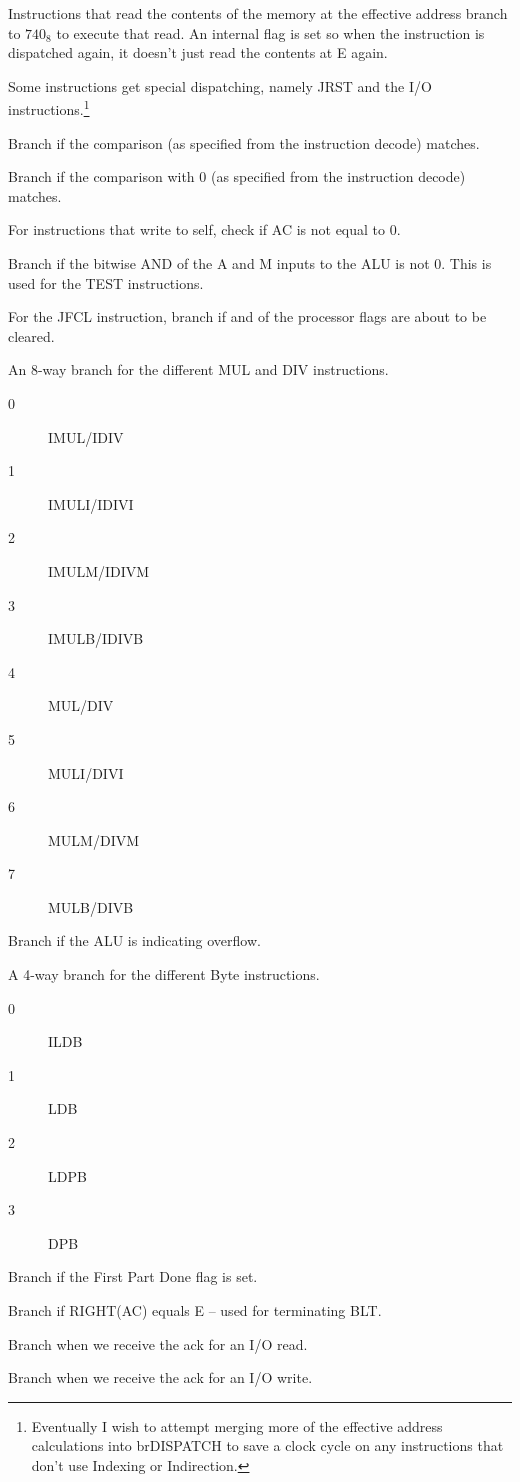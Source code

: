 \documentclass[12pt]{report}
\newcommand{\code}[1]{\textsf{#1}}
\begin{document}
\begin{description}
  Instructions that read the contents of the memory at the effective address branch to $740_8$
  to execute that read.  An internal flag is set so when the instruction is dispatched again, it
  doesn't just read the contents at E again.

  Some instructions get special dispatching, namely \code{JRST} and the I/O
  instructions.\footnote{Eventually I wish to attempt merging more of the effective address
    calculations into brDISPATCH to save a clock cycle on any instructions that don't use
    Indexing or Indirection.}
\item[brCOMP]
  Branch if the comparison (as specified from the instruction decode) matches.
\item[brCOMP0]
  Branch if the comparison with 0 (as specified from the instruction decode) matches.
\item[brSELF]
  For instructions that write to self, check if AC is not equal to 0.
\item[brTEST]
  Branch if the bitwise AND of the A and M inputs to the ALU is not 0.  This is used for the
  \code{TEST} instructions.
\item[brJFCL]
  For the \code{JFCL} instruction, branch if and of the processor flags are about to be cleared.
\item[brMUL]
  An 8-way branch for the different \code{MUL} and \code{DIV} instructions.
  \begin{description}
  \item[0] \code{IMUL}/\code{IDIV}
  \item[1] \code{IMULI}/\code{IDIVI}
  \item[2] \code{IMULM}/\code{IDIVM}
  \item[3] \code{IMULB}/\code{IDIVB}
  \item[4] \code{MUL}/\code{DIV}
  \item[5] \code{MULI}/\code{DIVI}
  \item[6] \code{MULM}/\code{DIVM}
  \item[7] \code{MULB}/\code{DIVB}
  \end{description}
\item[brOVR]
  Branch if the ALU is indicating overflow.
\item[brBPDISP]
  A 4-way branch for the different Byte instructions.
  \begin{description}
  \item[0] \code{ILDB}
  \item[1] \code{LDB}
  \item[2] \code{LDPB}
  \item[3] \code{DPB}
  \end{description}
\item[brFPD]
  Branch if the First Part Done flag is set.
\item[brBLTDONE]
  Branch if RIGHT(AC) equals E -- used for terminating \code{BLT}.
\item[brIOREAD]
  Branch when we receive the ack for an I/O read.
\item[brIOWRITE]
  Branch when we receive the ack for an I/O write.
\end{description}
\end{document}
